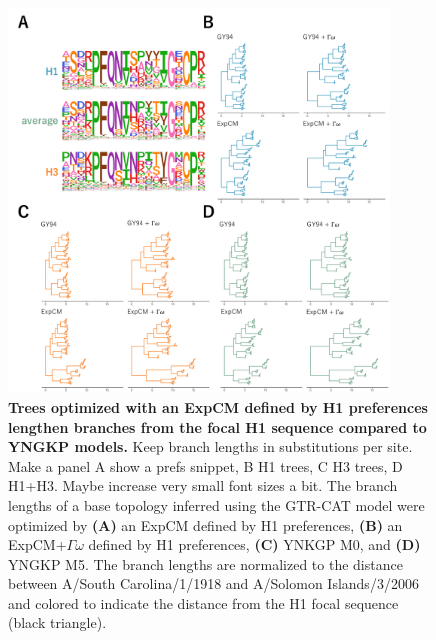 \documentclass[11pt]{article}
\newcommand\jdbcomment[1]{{\color{red}#1}}
\begin{document}
\begin{figure}[H]
\centerline{\includegraphics[width=0.90\textwidth]{figures/empirical_trees}}
\caption{\label{fig:empirical_trees}
\textbf{Trees optimized with an ExpCM defined by H1 preferences lengthen branches from the focal H1 sequence compared to YNGKP models.} 
\jdbcomment{Keep branch lengths in substitutions per site. Make a panel A show a prefs snippet, B H1 trees, C H3 trees, D H1+H3. Maybe increase very small font sizes a bit.}
The branch lengths of a base topology inferred using the GTR-CAT model were optimized by \textbf{(A)} an ExpCM defined by H1 preferences, \textbf{(B)} an ExpCM+$\Gamma\omega$ defined by H1 preferences, \textbf{(C)} YNKGP M0, and \textbf{(D)} YNGKP M5.
The branch lengths are normalized to the distance between A/South Carolina/1/1918 and A/Solomon Islands/3/2006 and colored to indicate the distance from the H1 focal sequence (black triangle).
}
\end{figure}
\end{document}
